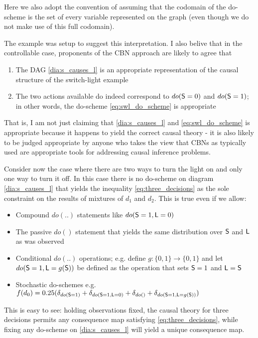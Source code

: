 Here we also adopt the convention of assuming that the codomain of the do-scheme is the set of every variable represented on the graph (even though we do not make use of this full codomain).

The example was setup to suggest this interpretation. I also belive that in the controllable case, proponents of the CBN approach are likely to agree that
\begin{enumerate}
 \item The DAG \ref{dia:s_causes_l} is an appropriate representation of the causal structure of the switch-light example
 \item The two actions available do indeed correspond to $do(\mathsf{S}=0)$ and $do(\mathsf{S}=1)$; in other words, the do-scheme \ref{eq:swl_do_scheme} is appropriate
\end{enumerate}

That is, I am not just claiming that \ref{dia:s_causes_l} and \ref{eq:swl_do_scheme} is appropriate because it happens to yield the correct causal theory - it is also likely to be judged appropriate by anyone who takes the view that CBNs as typically used are appropriate tools for addressing causal inference problems.

Consider now the case where there are two ways to turn the light on and only one way to turn it off. In this case there is no do-scheme on diagram \ref{dia:s_causes_l} that yields the inequality \ref{eq:three_decisions} as the sole constraint on the results of mixtures of $d_1$ and $d_2$. This is true even if we allow:
\begin{itemize}
	\item Compound $do(..)$ statements like $do(\mathsf{S}=1,\mathsf{L}=0)$
	\item The passive $do()$ statement that yields the same distribution over $\mathsf{S}$ and $\mathsf{L}$ as was observed
	\item Conditional $do(..)$ operations; e.g. define $g:\{0,1\}\to \{0,1\}$ and let $do(\mathsf{S}=1,\mathsf{L}=g(\mathsf{S}))$ be defined as the operation that sets $\mathsf{S}=1$ and $\mathsf{L}=\mathsf{S}$ 
	\item Stochastic do-schemes e.g. $f(d_0) = 0.25(\delta_{do(\mathsf{S}=1)} + \delta_{do(\mathsf{S}=1,\mathsf{L}=0)} + \delta_{do()} + \delta_{do(\mathsf{S}=1,\mathsf{L}=g(\mathsf{S}))})$
\end{itemize}
This is easy to see: holding observations fixed, the causal theory for three decisions permits any consequence map satisfying \ref{eq:three_decisions}, while fixing any do-scheme on \ref{dia:s_causes_l} will yield a unique consequence map.

